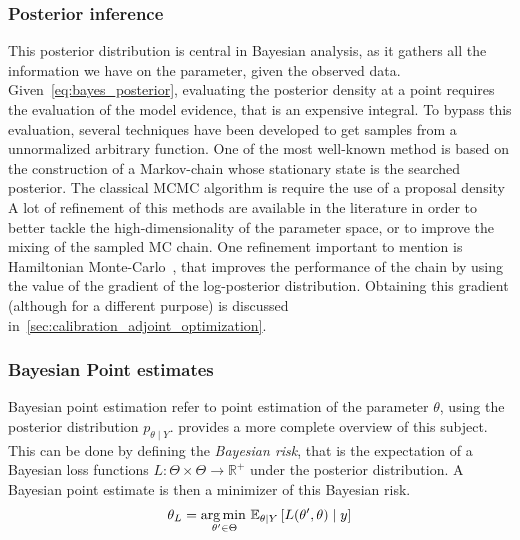 \documentclass[../../Main_ManuscritThese.tex]{subfiles}
\begin{document}
\subsubsection{Posterior inference}
\label{sec:posterior_inference}
This posterior distribution is central in Bayesian analysis, as it gathers all the information we have on the parameter, given the observed data. Given~\cref{eq:bayes_posterior}, evaluating the posterior density at a point requires the evaluation of the model evidence, that is an expensive integral. To bypass this evaluation, several techniques have been developed to get samples from a unnormalized arbitrary function. One of the most well-known method is based on the construction of a Markov-chain whose stationary state is the searched posterior. The classical MCMC algorithm is require the use of a proposal density
A lot of refinement of this methods are available in the literature in order to better tackle the high-dimensionality of the parameter space, or to improve the mixing of the sampled MC chain. One refinement important to mention is Hamiltonian Monte-Carlo~\cite{hanson_markov_2001,betancourt_conceptual_2017}, that improves the performance of the chain by using the value of the gradient of the log-posterior distribution. Obtaining this gradient (although for a different purpose) is discussed in~\cref{sec:calibration_adjoint_optimization}.


\subsubsection{Bayesian Point estimates}
\label{sec:bayes_point_estimates}
Bayesian point estimation refer to point estimation of the parameter $\theta$, using the posterior distribution $p_{\theta \mid Y}$.\cite{lehmann_theory_2006} provides a more complete overview of this subject.
This can be done by defining the \emph{Bayesian risk}, that is the expectation of a Bayesian loss functions $L: \Theta \times \Theta \rightarrow \mathbb{R}^+$ under the posterior distribution. A Bayesian point estimate is then a minimizer of this Bayesian risk.
\begin{equation}
  \theta_{L} = \operatorname*{arg\,min \,}_{\theta^{\prime} \in \Theta} \mathbb{E}_{\theta\mid Y}\left[L(\theta^{\prime}, \theta) \mid y\right]
\end{equation}
\end{document}
